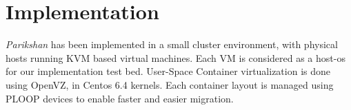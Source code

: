 
\section{Implementation}
\label{sec:implementation}

\textit{Parikshan} has been implemented in a small cluster environment, with physical hosts running KVM based virtual machines.
Each VM is considered as a host-os for our implementation test bed.
User-Space Container virtualization is done using OpenVZ\cite{openvz}, in Centos 6.4 kernels.
Each container layout is managed using PLOOP\cite{ploop} devices to enable faster and easier migration.
